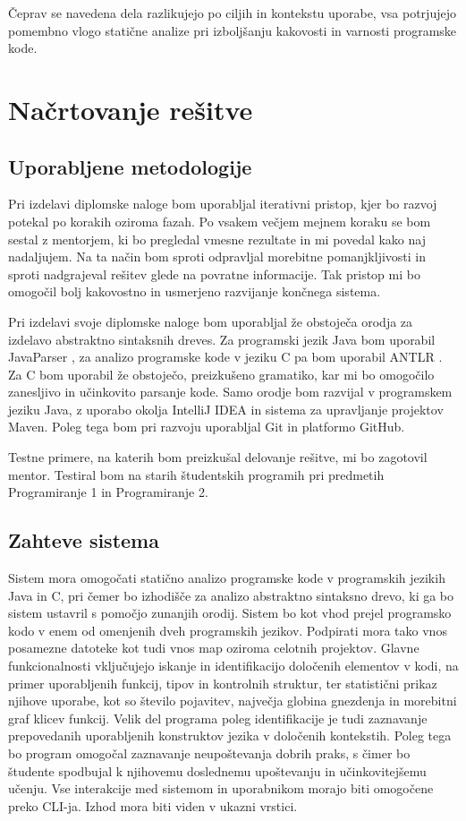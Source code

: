 \documentclass[a4paper,12pt,openright]{book}
\begin{document}
Čeprav se navedena dela razlikujejo po ciljih in kontekstu uporabe, vsa potrjujejo pomembno vlogo statične analize pri izboljšanju kakovosti in varnosti programske kode.


\chapter{Načrtovanje rešitve}
\label{ch1}

\section{Uporabljene metodologije}

Pri izdelavi diplomske naloge bom uporabljal iterativni pristop, kjer bo razvoj potekal po korakih oziroma fazah. Po vsakem večjem mejnem koraku se bom sestal z mentorjem, ki bo pregledal vmesne rezultate in mi povedal kako naj nadaljujem. Na ta način bom sproti odpravljal morebitne pomanjkljivosti in sproti nadgrajeval rešitev glede na povratne informacije. Tak pristop mi bo omogočil bolj kakovostno in usmerjeno razvijanje končnega sistema.

Pri izdelavi svoje diplomske naloge bom uporabljal že obstoječa orodja za izdelavo abstraktno sintaksnih dreves. Za programski jezik Java bom uporabil JavaParser \cite{javaparser}, za analizo programske kode v jeziku C pa bom uporabil ANTLR \cite{antlr}. Za C bom uporabil že obstoječo, preizkušeno gramatiko, kar mi bo omogočilo zanesljivo in učinkovito parsanje kode. Samo orodje bom razvijal v programskem jeziku Java, z uporabo okolja IntelliJ IDEA in sistema za upravljanje projektov Maven. Poleg tega bom pri razvoju uporabljal Git in platformo GitHub.

Testne primere, na katerih bom preizkušal delovanje rešitve, mi bo zagotovil mentor. Testiral bom na starih študentskih programih pri predmetih Programiranje 1 in Programiranje 2.

\section{Zahteve sistema}

Sistem mora omogočati statično analizo programske kode v programskih jezikih Java in C, pri čemer bo izhodišče za analizo abstraktno sintaksno drevo, ki ga bo sistem ustavril s pomočjo zunanjih orodij. Sistem bo kot vhod prejel programsko kodo v enem od omenjenih dveh programskih jezikov. Podpirati mora tako vnos posamezne datoteke kot tudi vnos map oziroma celotnih projektov. Glavne funkcionalnosti vključujejo iskanje in identifikacijo določenih elementov v kodi, na primer uporabljenih funkcij, tipov in kontrolnih struktur, ter statistični prikaz njihove uporabe, kot so število pojavitev, največja globina gnezdenja in morebitni graf klicev funkcij. Velik del programa poleg identifikacije je tudi zaznavanje prepovedanih uporabljenih konstruktov jezika v določenih kontekstih. Poleg tega bo program omogočal zaznavanje neupoštevanja dobrih praks, s čimer bo študente spodbujal k njihovemu doslednemu upoštevanju in učinkovitejšemu učenju. Vse interakcije med sistemom in uporabnikom morajo biti omogočene preko CLI-ja. Izhod mora biti viden v ukazni vrstici.
\end{document}
